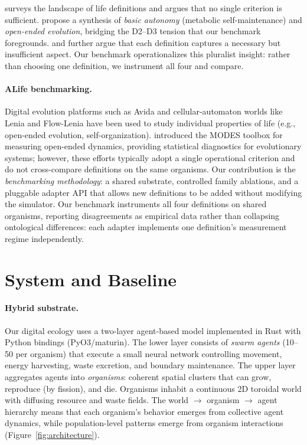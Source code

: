 \documentclass[letterpaper]{article}
\begin{document}
\citet{bedau_2008_nature} surveys the landscape of life definitions and
argues that no single criterion is sufficient.
\citet{ruizmirazo_2004_universal} propose a synthesis of \emph{basic
autonomy} (metabolic self-maintenance) and \emph{open-ended evolution},
bridging the D2--D3 tension that our benchmark foregrounds.
\citet{cleland_2002_defining} and \citet{benner_2010_defining} further
argue that each definition captures a necessary but insufficient
aspect.  Our benchmark operationalizes this pluralist insight: rather than
choosing one definition, we instrument all four and compare.

\paragraph{ALife benchmarking.}
Digital evolution platforms such as Avida \citep{ofria_2004_avida} and
cellular-automaton worlds like Lenia \citep{chan_2019_lenia} and
Flow-Lenia \citep{plantec_2023_flow} have been used to study individual
properties of life (e.g., open-ended evolution, self-organization).
\citet{dolson_2019_modes} introduced the MODES toolbox for measuring
open-ended dynamics, providing statistical diagnostics for evolutionary
systems; however, these efforts typically adopt a single operational
criterion and do not cross-compare definitions on the same organisms.
Our contribution is the \emph{benchmarking methodology}: a shared substrate,
controlled family ablations, and a pluggable adapter API that allows new
definitions to be added without modifying the simulator.  Our benchmark
instruments all four definitions on shared organisms, reporting disagreements
as empirical data rather than collapsing ontological differences: each adapter
implements one definition's measurement regime independently.

\section{System and Baseline}
\label{sec:system}

\paragraph{Hybrid substrate.}
Our digital ecology uses a two-layer agent-based model implemented in Rust
with Python bindings (PyO3/maturin).  The lower layer consists of
\emph{swarm agents} (10--50 per organism) that execute a small neural
network controlling movement, energy harvesting, waste excretion, and
boundary maintenance.  The upper layer aggregates agents into
\emph{organisms}: coherent spatial clusters that can grow, reproduce
(by fission), and die.  Organisms inhabit a continuous 2D toroidal
world with diffusing resource and waste fields.
The world $\to$ organism $\to$ agent hierarchy means that each organism's
behavior emerges from collective agent dynamics, while population-level
patterns emerge from organism interactions (Figure~\ref{fig:architecture}).
\end{document}
